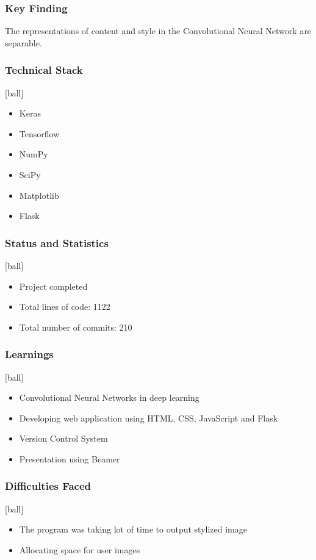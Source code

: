 \documentclass[14pt]{beamer}
\begin{document}
\begin{frame}
		\frametitle{Key Finding}
		The representations of content and style in the Convolutional Neural Network are separable.
\end{frame}

\begin{frame}
		\frametitle{Technical Stack}
		\begin{itemize}
		\item Keras 
        \item Tensorflow
		\item NumPy
		\item SciPy
        \item Matplotlib
		\item Flask  
		\end{itemize}
\end{frame}

\begin{frame}
		\frametitle{Status and Statistics}
		\begin{itemize}
		\item Project completed
        \item Total lines of code: 1122
		\item Total number of commits: 210
		\end{itemize}
\end{frame}

\begin{frame}
		\frametitle{Learnings}
        \begin{itemize}
		\item Convolutional Neural Networks in deep learning
        \item Developing web application using HTML, CSS, JavaScript and Flask
		\item Version Control System
		\item Presentation using Beamer
		\end{itemize}
\end{frame}

\begin{frame}
		\frametitle{Difficulties Faced}
        \begin{itemize}

				\item The program was taking lot of time to output stylized image
                \item Allocating space for user images
		\end{itemize}
\end{frame}
\end{document}
